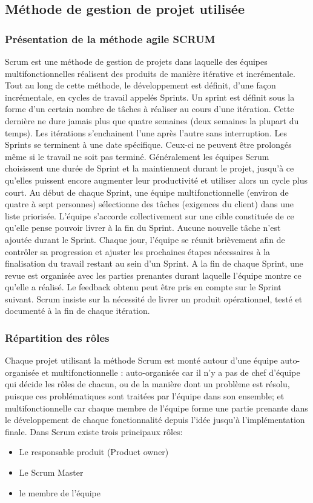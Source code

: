 \subsection{Méthode de gestion de projet utilisée}
\subsubsection{Présentation de la méthode agile SCRUM}
Scrum est une méthode de gestion de projets dans laquelle des équipes
multifonctionnelles réalisent des produits de manière itérative et incrémentale. Tout au
long de cette méthode, le développement est définit, d’une façon incrémentale, en cycles
de travail appelés Sprints. Un sprint est définit sous la forme d’un certain nombre de
tâches à réaliser au cours d’une itération. Cette dernière ne dure jamais plus que quatre
semaines (deux semaines la plupart du temps). Les itérations s’enchainent l’une après
l’autre sans interruption. Les Sprints se terminent à une date spécifique. Ceux-ci ne
peuvent être prolongés même si le travail ne soit pas terminé. Généralement les équipes
Scrum choisissent une durée de Sprint et la maintiennent durant le projet, jusqu’à ce
qu’elles puissent encore augmenter leur productivité et utiliser alors un cycle plus court.
Au début de chaque Sprint, une équipe multifonctionnelle (environ de quatre à sept
personnes) sélectionne des tâches (exigences du client) dans une liste priorisée.
L’équipe s’accorde collectivement sur une cible constituée de ce qu’elle pense pouvoir
livrer à la fin du Sprint. Aucune nouvelle tâche n’est ajoutée durant le Sprint. Chaque
jour, l’équipe se réunit brièvement afin de contrôler sa progression et ajuster les
prochaines étapes nécessaires à la finalisation du travail restant au sein d’un Sprint. A la
fin de chaque Sprint, une revue est organisée avec les parties prenantes durant laquelle
l’équipe montre ce qu’elle a réalisé. Le feedback obtenu peut être pris en compte sur le
Sprint suivant. Scrum insiste sur la nécessité de livrer un produit opérationnel,
testé et documenté à la fin de chaque itération.
\subsubsection{Répartition des rôles}
Chaque projet utilisant la méthode Scrum est monté autour d’une équipe auto-
organisée et multifonctionnelle : auto-organisée car il n’y a pas de chef d’équipe qui
décide les rôles de chacun, ou de la manière dont un problème est résolu, puisque ces
problématiques sont traitées par l’équipe dans son ensemble; et multifonctionnelle car
chaque membre de l’équipe forme une partie prenante dans le développement de
chaque fonctionnalité depuis l’idée jusqu’à l’implémentation finale.
Dans Scrum existe trois principaux rôles:
\begin{itemize}
 \item Le responsable produit (Product owner)
 \item Le Scrum Master
 \item le membre de l’équipe
\end{itemize}
